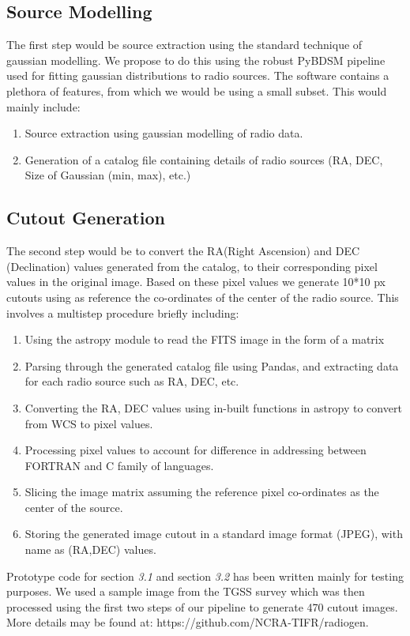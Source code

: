 \documentclass{article}
\begin{document}
\begin{multicols*}{2}
\subsection{Source Modelling}
  The first step would be source extraction using the standard technique of gaussian modelling. We propose to do this using the robust PyBDSM pipeline used for fitting gaussian distributions to radio sources. The software contains a plethora of features, from which we would be using a small subset. This would mainly include:

\begin{enumerate}
\item Source extraction using gaussian modelling of radio data.
\item Generation of a catalog file containing details of radio sources (RA, DEC, Size of Gaussian (min, max), etc.)
\end{enumerate}

\subsection{Cutout Generation}
The second step would be to convert the RA(Right Ascension) and DEC (Declination) values generated from the catalog, to their corresponding pixel values in the original image. Based on these pixel values we generate 10*10 px cutouts using as reference the co-ordinates of the center of the radio source. This involves a multistep procedure briefly including:
\begin{enumerate}
\item Using the astropy module to read the FITS image in the form of a matrix
\item Parsing through the generated catalog file using Pandas, and extracting data for each radio source such as RA, DEC, etc.
\item Converting the RA, DEC values using in-built functions in astropy to convert from WCS to pixel values.
\item Processing pixel values to account for difference in addressing between FORTRAN and C family of languages.
\item Slicing the image matrix assuming the reference pixel co-ordinates as the center of the source.
\item Storing the generated image cutout in a standard image format (JPEG), with name as (RA,DEC) values. 
\end{enumerate}

Prototype code for section \textit{3.1} and section \textit{3.2} has been written mainly for testing purposes. We used a sample image from the TGSS survey which was then processed using the first two steps of our pipeline to generate 470 cutout images.
More details may be found at: 
https://github.com/NCRA-TIFR/radiogen.


\end{multicols*}
\end{document}
